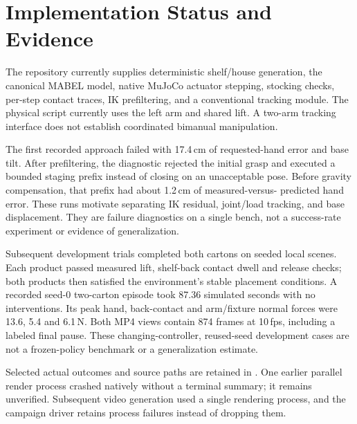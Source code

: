 \section{Implementation Status and Evidence}
The repository currently supplies deterministic shelf/house generation, the
canonical MABEL model, native MuJoCo actuator stepping, stocking checks, per-step
contact traces, IK prefiltering, and a conventional tracking module. The physical
script currently uses the left arm and shared lift. A two-arm tracking interface
does not establish coordinated bimanual manipulation.

The first recorded approach failed with 17.4\,cm of requested-hand error and
base tilt. After prefiltering, the diagnostic rejected the initial grasp and
executed a bounded staging prefix instead of closing on an unacceptable pose.
Before gravity compensation, that prefix had about 1.2\,cm of measured-versus-
predicted hand error. These runs motivate separating IK residual, joint/load
tracking, and base displacement. They are failure diagnostics on a single bench,
not a success-rate experiment or evidence of generalization.

Subsequent development trials completed both cartons on seeded local scenes.
Each product passed measured lift, shelf-back contact dwell and release checks;
both products then satisfied the environment's stable placement conditions.
A recorded seed-0 two-carton episode took 87.36 simulated seconds with no
interventions. Its peak hand, back-contact and arm/fixture normal forces were
13.6, 5.4 and 6.1\,N. Both MP4 views contain 874 frames at 10\,fps, including a
labeled final pause. These changing-controller, reused-seed development cases
are not a frozen-policy benchmark or a generalization estimate.

Selected actual outcomes and source paths are retained in
. One earlier parallel render process
crashed natively without a terminal summary; it remains unverified. Subsequent
video generation used a single rendering process, and the campaign driver
retains process failures instead of dropping them.

